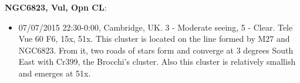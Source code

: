 {\bf NGC6823, Vul, Opn CL}:
\begin{itemize}
\item 07/07/2015 22:30-0:00, Cambridge, UK. 3 - Moderate seeing, 5 - Clear. Tele Vue 60 F6, 15x, 51x. This cluster is located on the line formed by M27 and NGC6823. From it, two roads of stars form and converge at 3 degrees South East with Cr399, the Brocchi's cluster. Also this cluster is relatively smallish and emerges at 51x. 
\end{itemize}
